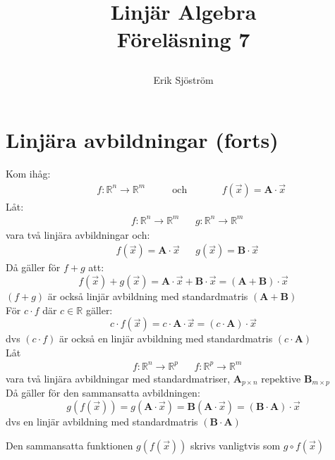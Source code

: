 
\title{
	 Linjär Algebra\\
	 Föreläsning 7
    \author{Erik Sjöström}
}

\maketitle
\section{Linjära avbildningar (forts)} %
\label{sec:linj_ra_avbildningar_}
Kom ihåg:
\begin{align*}
&&f:\mathbb{R}^n \rightarrow \mathbb{R}^m
&&&\mbox{ och }
&&&&f(\vec{x}) = \mathbf{A} \cdot \vec{x}
\end{align*}
Låt:
\begin{align*}
&f:\mathbb{R}^n \rightarrow \mathbb{R}^m
&&g:\mathbb{R}^n \rightarrow \mathbb{R}^m
\end{align*}
vara två linjära avbildningar och:
\begin{align*}
&f(\vec{x}) = \mathbf{A} \cdot \vec{x}
&&g(\vec{x}) = \mathbf{B} \cdot \vec{x}
\end{align*}
Då gäller för $f+g$ att:
\[
    f(\vec{x}) + g(\vec{x}) = \mathbf{A} \cdot \vec{x} + \mathbf{B} \cdot \vec{x} = (\mathbf{A} + \mathbf{B}) \cdot \vec{x}
\]
$(f+g)$ är också linjär avbildning med standardmatris $(\mathbf{A}+\mathbf{B})$\\
För $c \cdot f$ där $c \in \mathbb{R}$ gäller:
\[
    c \cdot f(\vec{x}) = c \cdot \mathbf{A} \cdot \vec{x} = (c \cdot \mathbf{A}) \cdot \vec{x}
\]
dvs $(c \cdot f)$ är också en linjär avbildning med standardmatris $(c \cdot \mathbf{A})$\\
Låt 
\begin{align*}
&f:\mathbb{R}^n \rightarrow \mathbb{R}^p
&&f:\mathbb{R}^p \rightarrow \mathbb{R}^m
\end{align*}
vara två linjära avbildningar med standardmatriser, $\mathbf{A}_{p \times n}$ repektive $\mathbf{B}_{m \times p}$\\
Då gäller för den sammansatta avbildningen:
\[
    g(f(\vec{x})) = g(\mathbf{A} \cdot \vec{x}) = \mathbf{B}(\mathbf{A} \cdot \vec{x}) = (\mathbf{B} \cdot \mathbf{A}) \cdot \vec{x}
\]
dvs en linjär avbildning med standardmatris $(\mathbf{B} \cdot \mathbf{A})$
\begin{Rem}
    Den sammansatta funktionen $g(f(\vec{x}))$ skrivs vanligtvis som $g \circ f(\vec{x})$
\end{Rem}
\newpage
